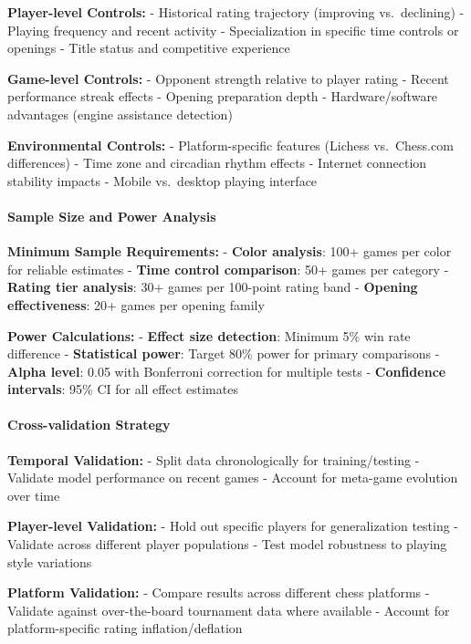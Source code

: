\documentclass[
]{article}
\begin{document}
\textbf{Player-level Controls:} - Historical rating trajectory
(improving vs.~declining) - Playing frequency and recent activity -
Specialization in specific time controls or openings - Title status and
competitive experience

\textbf{Game-level Controls:} - Opponent strength relative to player
rating - Recent performance streak effects - Opening preparation depth -
Hardware/software advantages (engine assistance detection)

\textbf{Environmental Controls:} - Platform-specific features (Lichess
vs.~Chess.com differences) - Time zone and circadian rhythm effects -
Internet connection stability impacts - Mobile vs.~desktop playing
interface

\paragraph{Sample Size and Power
Analysis}\label{sample-size-and-power-analysis}

\textbf{Minimum Sample Requirements:} - \textbf{Color analysis}: 100+
games per color for reliable estimates - \textbf{Time control
comparison}: 50+ games per category - \textbf{Rating tier analysis}: 30+
games per 100-point rating band - \textbf{Opening effectiveness}: 20+
games per opening family

\textbf{Power Calculations:} - \textbf{Effect size detection}: Minimum
5\% win rate difference - \textbf{Statistical power}: Target 80\% power
for primary comparisons - \textbf{Alpha level}: 0.05 with Bonferroni
correction for multiple tests - \textbf{Confidence intervals}: 95\% CI
for all effect estimates

\paragraph{Cross-validation Strategy}\label{cross-validation-strategy}

\textbf{Temporal Validation:} - Split data chronologically for
training/testing - Validate model performance on recent games - Account
for meta-game evolution over time

\textbf{Player-level Validation:} - Hold out specific players for
generalization testing - Validate across different player populations -
Test model robustness to playing style variations

\textbf{Platform Validation:} - Compare results across different chess
platforms - Validate against over-the-board tournament data where
available - Account for platform-specific rating inflation/deflation
\end{document}
